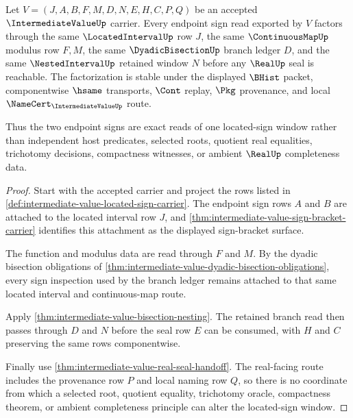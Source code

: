 \begin{theorem}
\label{thm:intermediate-value-located-sign-window-exactness}
Let $V=(J,A,B,F,M,D,N,E,H,C,P,Q)$ be an accepted $\IntermediateValueUp$ carrier. Every endpoint sign read exported by $V$ factors through the same $\LocatedIntervalUp$ row $J$, the same $\ContinuousMapUp$ modulus row $F,M$, the same $\DyadicBisectionUp$ branch ledger $D$, and the same $\NestedIntervalUp$ retained window $N$ before any $\RealUp$ seal is reachable. The factorization is stable under the displayed $\BHist$ packet, componentwise $\hsame$ transports, $\Cont$ replay, $\Pkg$ provenance, and local $\NameCert_{\IntermediateValueUp}$ route.

Thus the two endpoint signs are exact reads of one located-sign window rather than independent host predicates, selected roots, quotient real equalities, trichotomy decisions, compactness witnesses, or ambient $\RealUp$ completeness data.
\end{theorem}
\begin{proof}
Start with the accepted carrier and project the rows listed in \autoref{def:intermediate-value-located-sign-carrier}. The endpoint sign rows $A$ and $B$ are attached to the located interval row $J$, and \autoref{thm:intermediate-value-sign-bracket-carrier} identifies this attachment as the displayed sign-bracket surface.

The function and modulus data are read through $F$ and $M$. By the dyadic bisection obligations of \autoref{thm:intermediate-value-dyadic-bisection-obligations}, every sign inspection used by the branch ledger remains attached to that same located interval and continuous-map route.

Apply \autoref{thm:intermediate-value-bisection-nesting}. The retained branch read then passes through $D$ and $N$ before the seal row $E$ can be consumed, with $H$ and $C$ preserving the same rows componentwise.

Finally use \autoref{thm:intermediate-value-real-seal-handoff}. The real-facing route includes the provenance row $P$ and local naming row $Q$, so there is no coordinate from which a selected root, quotient equality, trichotomy oracle, compactness theorem, or ambient completeness principle can alter the located-sign window.
\end{proof}

